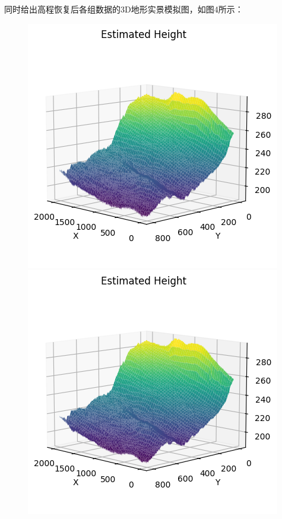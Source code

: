 \documentclass[a4paper]{article}
\begin{document}
	同时给出高程恢复后各组数据的3D地形实景模拟图，如图4所示：\par

	\begin{figure}[H]
		\centering
		\begin{minipage}[b]{0.4\textwidth}
			\centering
			\includegraphics[width=\linewidth]{images/t1/unwrap3d_2.png}
		\end{minipage}
		\hspace{0.05\textwidth}
		\begin{minipage}[b]{0.4\textwidth}
			\centering
			\includegraphics[width=\linewidth]{images/t1/unwrap3d_3.png}
		\end{minipage}


\end{figure}
\end{document}
